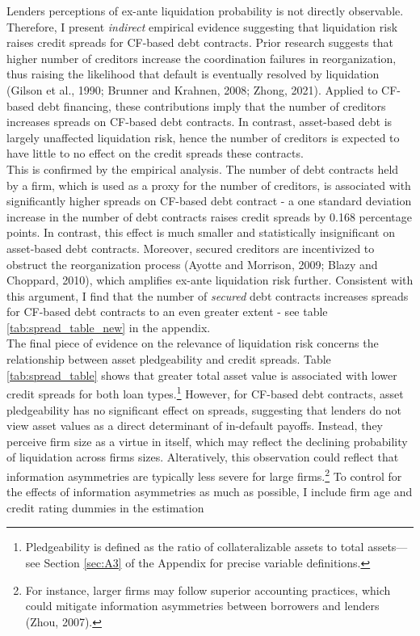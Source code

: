 \documentclass[12pt]{article}
\begin{document}
\noindent 
Lenders perceptions of ex-ante liquidation probability is not directly observable. Therefore, I present \textit{indirect} empirical evidence suggesting that liquidation risk raises credit spreads for CF-based debt contracts. Prior research suggests that higher number of creditors increase the coordination failures in reorganization, thus raising the likelihood that default is eventually resolved by liquidation (Gilson et al., 1990; Brunner and Krahnen, 2008; Zhong, 2021). Applied to CF-based debt financing, these contributions imply that the number of creditors increases spreads on CF-based debt contracts. In contrast, asset-based debt is largely unaffected liquidation risk, hence the number of creditors is expected to have little to no effect on the credit spreads these contracts. \vspace{3mm} \\
This is confirmed by the empirical analysis. The number of debt contracts held by a firm, which is used as a proxy for the number of creditors, is associated with significantly higher spreads on CF-based debt contract - a one standard deviation increase in the number of debt contracts raises credit spreads by 0.168 percentage points. In contrast, this effect is much smaller and statistically insignificant on asset-based debt contracts. Moreover, secured creditors are incentivized to obstruct the reorganization process (Ayotte and Morrison, 2009; Blazy and Choppard, 2010), which amplifies ex-ante liquidation risk further. Consistent with this argument, I find that the number of \textit{secured} debt contracts increases spreads for CF-based debt contracts to an even greater extent - see table \ref{tab:spread_table_new} in the appendix.  \vspace{3mm} \\
The final piece of evidence on the relevance of liquidation risk concerns the relationship between asset pledgeability and credit spreads. Table \ref{tab:spread_table} shows that greater total asset value is associated with lower credit spreads for both loan types.\footnote{Pledgeability is defined as the ratio of collateralizable assets to total assets—see Section \ref{sec:A3} of the Appendix for precise variable definitions.} However, for CF-based debt contracts, asset pledgeability has no significant effect on spreads, suggesting that lenders do not view asset values as a direct determinant of in-default payoffs. Instead, they perceive firm size as a virtue in itself, which may reflect the declining probability of liquidation across firms sizes. Alteratively, this observation could reflect that information asymmetries are typically less severe for large firms.\footnote{For instance, larger firms may follow superior accounting practices, which could mitigate information asymmetries between borrowers and lenders (Zhou, 2007).} To control for the effects of information asymmetries as much as possible, I include firm age and credit rating dummies in the estimation
\end{document}

